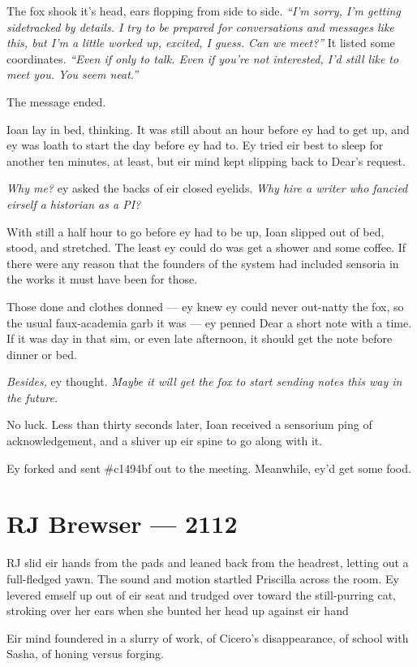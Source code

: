 The fox shook it's head, ears flopping from side to side. \emph{``I'm sorry, I'm getting sidetracked by details. I try to be prepared for conversations and messages like this, but I'm a little worked up, excited, I guess. Can we meet?''} It listed some coordinates. \emph{``Even if only to talk. Even if you're not interested, I'd still like to meet you. You seem neat.''}

The message ended.

Ioan lay in bed, thinking. It was still about an hour before ey had to get up, and ey was loath to start the day before ey had to. Ey tried eir best to sleep for another ten minutes, at least, but eir mind kept slipping back to Dear's request.

\emph{Why me?} ey asked the backs of eir closed eyelids. \emph{Why hire a writer who fancied eirself a historian as a PI?}

With still a half hour to go before ey had to be up, Ioan slipped out of bed, stood, and stretched. The least ey could do was get a shower and some coffee. If there were any reason that the founders of the system had included sensoria in the works it must have been for those.

Those done and clothes donned --- ey knew ey could never out-natty the fox, so the usual faux-academia garb it was --- ey penned Dear a short note with a time. If it was day in that sim, or even late afternoon, it should get the note before dinner or bed.

\emph{Besides,} ey thought. \emph{Maybe it will get the fox to start sending notes this way in the future.}

No luck. Less than thirty seconds later, Ioan received a sensorium ping of acknowledgement, and a shiver up eir spine to go along with it.

Ey forked and sent \#c1494bf out to the meeting. Meanwhile, ey'd get some food.

\chapter*{RJ Brewser — 2112}

RJ slid eir hands from the pads and leaned back from the headrest, letting out a full-fledged yawn. The sound and motion startled Priscilla across the room. Ey levered emself up out of eir seat and trudged over toward the still-purring cat, stroking over her ears when she bunted her head up against eir hand

Eir mind foundered in a slurry of work, of Cicero's disappearance, of school with Sasha, of honing versus forging.

